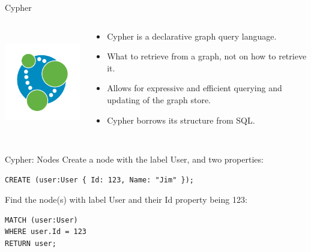 \begin{frame}{Cypher}
  \begin{columns}
    \begin{column}{0.25\textwidth}
      \includegraphics[height=1.8in]{img/neo4j.png}
    \end{column}
    \begin{column}{0.6\textwidth}
      \begin{itemize}
        \item Cypher is a declarative graph query language.
        \vspace{0.25cm}
        \item What to retrieve from a graph, not on how to retrieve it.
        \vspace{0.25cm}
        \item Allows for expressive and efficient querying and updating of the graph store.
        \vspace{0.25cm}
        \item Cypher borrows its structure from SQL.
      \end{itemize}
    \end{column}
  \end{columns}
\end{frame}


\begin{frame}[fragile]{Cypher: Nodes}
  Create a node with the label User, and two properties:
  \begin{verbatim}
CREATE (user:User { Id: 123, Name: "Jim" });
  \end{verbatim}
  \vspace{1cm}
  Find the node(s) with label User and their Id property being 123:
  \begin{verbatim}
MATCH (user:User)
WHERE user.Id = 123
RETURN user;
  \end{verbatim}
\end{frame}

